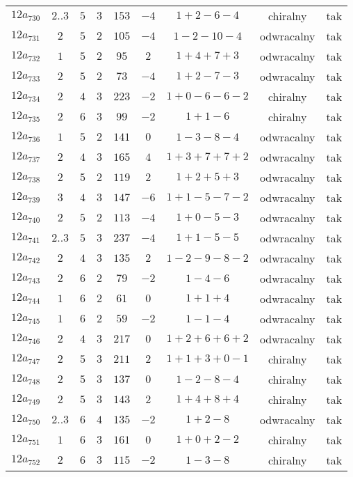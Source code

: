 \begin{longtable}{ccccccccc}
$12a_{730}$ & $2..3$ & $5$ & $3$ & $153$ & $-4$ & $1+2-6-4$ & chiralny & tak \\
$12a_{731}$ & $2$ & $5$ & $2$ & $105$ & $-4$ & $1-2-10-4$ & odwracalny & tak \\
$12a_{732}$ & $1$ & $5$ & $2$ & $95$ & $2$ & $1+4+7+3$ & odwracalny & tak \\
$12a_{733}$ & $2$ & $5$ & $2$ & $73$ & $-4$ & $1+2-7-3$ & odwracalny & tak \\
$12a_{734}$ & $2$ & $4$ & $3$ & $223$ & $-2$ & $1+0-6-6-2$ & chiralny & tak \\
$12a_{735}$ & $2$ & $6$ & $3$ & $99$ & $-2$ & $1+1-6$ & chiralny & tak \\
$12a_{736}$ & $1$ & $5$ & $2$ & $141$ & $0$ & $1-3-8-4$ & odwracalny & tak \\
$12a_{737}$ & $2$ & $4$ & $3$ & $165$ & $4$ & $1+3+7+7+2$ & odwracalny & tak \\
$12a_{738}$ & $2$ & $5$ & $2$ & $119$ & $2$ & $1+2+5+3$ & odwracalny & tak \\
$12a_{739}$ & $3$ & $4$ & $3$ & $147$ & $-6$ & $1+1-5-7-2$ & odwracalny & tak \\
$12a_{740}$ & $2$ & $5$ & $2$ & $113$ & $-4$ & $1+0-5-3$ & odwracalny & tak \\
$12a_{741}$ & $2..3$ & $5$ & $3$ & $237$ & $-4$ & $1+1-5-5$ & odwracalny & tak \\
$12a_{742}$ & $2$ & $4$ & $3$ & $135$ & $2$ & $1-2-9-8-2$ & odwracalny & tak \\
$12a_{743}$ & $2$ & $6$ & $2$ & $79$ & $-2$ & $1-4-6$ & odwracalny & tak \\
$12a_{744}$ & $1$ & $6$ & $2$ & $61$ & $0$ & $1+1+4$ & odwracalny & tak \\
$12a_{745}$ & $1$ & $6$ & $2$ & $59$ & $-2$ & $1-1-4$ & odwracalny & tak \\
$12a_{746}$ & $2$ & $4$ & $3$ & $217$ & $0$ & $1+2+6+6+2$ & odwracalny & tak \\
$12a_{747}$ & $2$ & $5$ & $3$ & $211$ & $2$ & $1+1+3+0-1$ & chiralny & tak \\
$12a_{748}$ & $2$ & $5$ & $3$ & $137$ & $0$ & $1-2-8-4$ & chiralny & tak \\
$12a_{749}$ & $2$ & $5$ & $3$ & $143$ & $2$ & $1+4+8+4$ & chiralny & tak \\
$12a_{750}$ & $2..3$ & $6$ & $4$ & $135$ & $-2$ & $1+2-8$ & odwracalny & tak \\
$12a_{751}$ & $1$ & $6$ & $3$ & $161$ & $0$ & $1+0+2-2$ & chiralny & tak \\
$12a_{752}$ & $2$ & $6$ & $3$ & $115$ & $-2$ & $1-3-8$ & chiralny & tak \\

\end{longtable}

